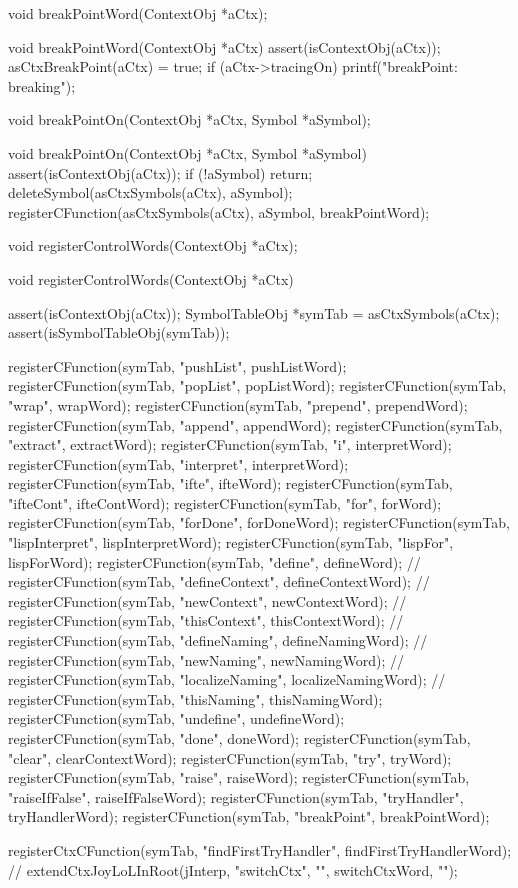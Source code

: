 \startCHeader
void breakPointWord(ContextObj *aCtx);
\stopCHeader

\startCCode
void breakPointWord(ContextObj *aCtx) {
  assert(isContextObj(aCtx));
  asCtxBreakPoint(aCtx) = true;
  if (aCtx->tracingOn) printf("breakPoint: breaking\n");
}
\stopCCode

\startCHeader
void breakPointOn(ContextObj *aCtx, Symbol *aSymbol);
\stopCHeader

\startCCode
void breakPointOn(ContextObj *aCtx, Symbol *aSymbol) {
  assert(isContextObj(aCtx));
  if (!aSymbol) return;
  deleteSymbol(asCtxSymbols(aCtx), aSymbol);
  registerCFunction(asCtxSymbols(aCtx), aSymbol, breakPointWord);
}
\stopCCode

\startTestSuite[registerControlWords]

\startCHeader
void registerControlWords(ContextObj *aCtx);
\stopCHeader

\startCCode
void registerControlWords(ContextObj *aCtx) {
  assert(isContextObj(aCtx));
  SymbolTableObj *symTab = asCtxSymbols(aCtx);
  assert(isSymbolTableObj(symTab));
 
  registerCFunction(symTab, "pushList",       pushListWord);
  registerCFunction(symTab, "popList",        popListWord);
  registerCFunction(symTab, "wrap",           wrapWord);
  registerCFunction(symTab, "prepend",        prependWord);
  registerCFunction(symTab, "append",         appendWord);
  registerCFunction(symTab, "extract",        extractWord);
  registerCFunction(symTab, "i",              interpretWord);
  registerCFunction(symTab, "interpret",      interpretWord);
  registerCFunction(symTab, "ifte",           ifteWord);
  registerCFunction(symTab, "ifteCont",       ifteContWord);
  registerCFunction(symTab, "for",            forWord);
  registerCFunction(symTab, "forDone",        forDoneWord);
  registerCFunction(symTab, "lispInterpret",  lispInterpretWord);
  registerCFunction(symTab, "lispFor",        lispForWord);
  registerCFunction(symTab, "define",         defineWord);
//  registerCFunction(symTab, "defineContext",  defineContextWord);
//  registerCFunction(symTab, "newContext",     newContextWord);
//  registerCFunction(symTab, "thisContext",    thisContextWord);
//  registerCFunction(symTab, "defineNaming",   defineNamingWord);
//  registerCFunction(symTab, "newNaming",      newNamingWord);
//  registerCFunction(symTab, "localizeNaming", localizeNamingWord);
//  registerCFunction(symTab, "thisNaming",     thisNamingWord);
  registerCFunction(symTab, "undefine",       undefineWord);
  registerCFunction(symTab, "done",           doneWord);
  registerCFunction(symTab, "clear",          clearContextWord);
  registerCFunction(symTab, "try",            tryWord);
  registerCFunction(symTab, "raise",          raiseWord);
  registerCFunction(symTab, "raiseIfFalse",   raiseIfFalseWord);
  registerCFunction(symTab, "tryHandler",     tryHandlerWord);
  registerCFunction(symTab, "breakPoint",     breakPointWord);
  
  registerCtxCFunction(symTab, "findFirstTryHandler", findFirstTryHandlerWord);
//  extendCtxJoyLoLInRoot(jInterp, "switchCtx",           "", switchCtxWord,           "");
}
\stopCCode

